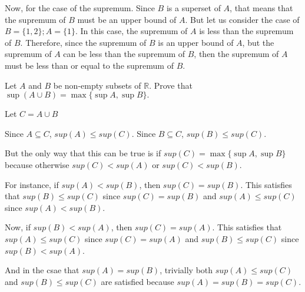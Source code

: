 \documentclass[answers]{exam}
\theoremstyle{remark}
\theoremstyle{definition}
\newcommand{\RR}{\mathbb{R}}
\begin{document}
\begin{questions}
\begin{solution}
Now, for the case of the supremum. Since $B$ is a superset of $A$,
that means that the supremum of $B$ must be an upper bound of $A$.
But let us consider the case of $B = \{1, 2\}; A = \{1\}$.
In this case, the supremum of $A$ is less than the supremum of $B$.
Therefore, since the supremum of $B$ is an upper bound of $A$, but the
supremum of $A$ can be less than the supremum of $B$, then the supremum
of $A$ must be less than or equal to the supremum of $B$.

\end{solution}


\question Let $A$ and $B$ be non-empty subsets of $\RR$. Prove that $\sup (A\cup B) = \max\{\sup A, \sup B\}.$

\begin{solution}

Let $C = A \cup B$

Since $A \subseteq C$, $sup(A) \leq sup(C)$.
Since $B \subseteq C$, $sup(B) \leq sup(C)$.

But the only way that this can be true is if
$sup(C) = \max\{\sup A, \sup B\}$ because otherwise
$sup(C) < sup(A)$ or $sup(C) < sup(B)$.

For instance, if $sup(A) < sup(B)$,
then $sup(C) = sup(B)$.
This satisfies that $sup(B) \leq sup(C)$ since $sup(C) = sup(B)$
and $sup(A) \leq sup(C)$ since $sup(A) < sup(B)$.

Now, if $sup(B) < sup(A)$,
then $sup(C) = sup(A)$.
This satisfies that $sup(A) \leq sup(C)$ since $sup(C) = sup(A)$
and $sup(B) \leq sup(C)$ since $sup(B) < sup(A)$.

And in the csae that $sup(A) = sup(B)$,
trivially both $sup(A) \leq sup(C)$ and $sup(B) \leq sup(C)$
are satisfied because
$sup(A) = sup(B) = sup(C)$.

\end{solution}

\end{questions}
\end{document}
